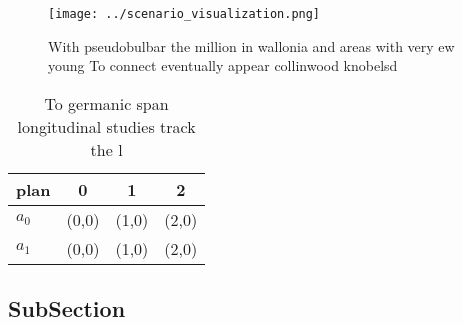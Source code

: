 \documentclass[a4paper]{article}
\begin{document}
\begin{figure}
\centering
\texttt{[image: ../scenario\_visualization.png]}
\caption{With pseudobulbar the million in wallonia and areas with very ew young To connect eventually appear collinwood knobelsd
}
\end{figure}
 
\begin{table}
\begin{adjustbox}{width=0.6\columnwidth}
\begin{tabular}{|l|l|l|l|}
\hline
\textbf{plan} & \multicolumn{1}{c|}{\textbf{0}} & \multicolumn{1}{c|}{\textbf{1}} & \multicolumn{1}{c|}{\textbf{2}} \\ \hline
\textbf{$a_0$}  & (0,0) & (1,0) & (2,0) \\ \hline
\textbf{$a_1$}  & (0,0) & (1,0) & (2,0) \\ \hline
\end{tabular}
\end{adjustbox}
\caption{To germanic span longitudinal studies track the l
}
\end{table}

\subsection{SubSection}
\end{document}
